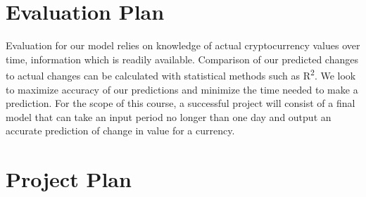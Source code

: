 \documentclass[sigconf]{acmart}
\begin{document}
\section{Evaluation Plan}
Evaluation for our model relies on knowledge of actual cryptocurrency values over time, information which is readily available. Comparison of our predicted changes to actual changes can be calculated with statistical methods such as R\textsuperscript{2}. We look to maximize accuracy of our predictions and minimize the time needed to make a prediction. For the scope of this course, a successful project will consist of a final model that can take an input period no longer than one day and output an accurate prediction of change in value for a currency.


\section{Project Plan}





\end{document}
